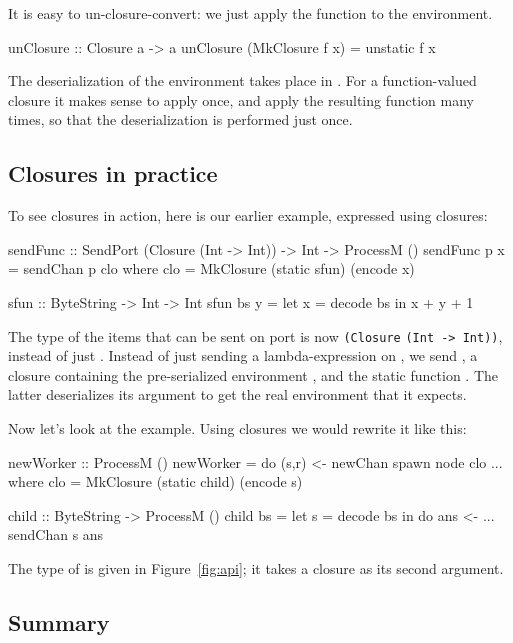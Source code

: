 \documentclass{sigplanconf}
\begin{document}
It is easy to un-closure-convert: we just apply the function to the environment.
\begin{code}
  unClosure :: Closure a -> a
  unClosure (MkClosure f x) = unstatic f x
\end{code}
The deserialization of the environment takes place in .
For a function-valued closure it makes sense to apply  once, and
apply the resulting function many times, so that the deserialization is
performed just once.

\subsection{Closures in practice} 
\label{s:closures-in-practice}

To see closures in action, here is our earlier  example, 
expressed using closures:
\begin{code}
  sendFunc :: SendPort (Closure (Int -> Int)) 
                              -> Int -> ProcessM ()
  sendFunc p x = sendChan p clo
    where clo = MkClosure (static sfun) (encode x)

  sfun :: ByteString -> Int -> Int
  sfun bs y = let x = decode bs 
               in x + y + 1
\end{code}
The type of the items that can be sent on port  is now \lstinline+(Closure+ \lstinline+(Int -> Int))+, instead of just .
Instead of just sending a lambda-expression on , we send , a
closure containing the pre-serialized environment ,
and the static function . The latter deserializes its
argument  to get the real environment  that it expects.

Now let's look at the  example.
Using closures we would rewrite it like this:
\begin{code}
  newWorker :: ProcessM ()
  newWorker = do (s,r) <- newChan
                 spawn node clo
                 ... 
    where clo = MkClosure (static child) (encode s)

  child :: ByteString -> ProcessM ()
  child bs = let s = decode bs
              in do ans <- ...
               	    sendChan s ans
\end{code}
The type of  is given in Figure~\ref{fig:api}; it takes
a closure as its second argument.

\subsection{Summary}
\end{document}
